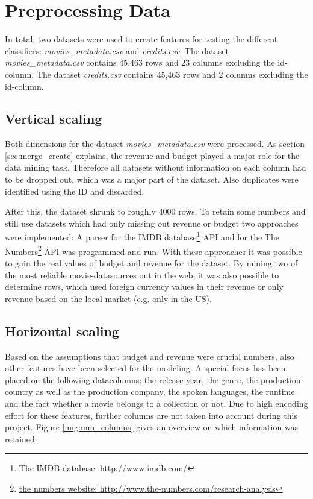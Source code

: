 \section{Preprocessing Data}
\label{cha:preprocessing}

In total, two datasets were used to create features for testing the different classifiers:
\textit{movies\_metadata.csv} and \textit{credits.csv}. The dataset \textit{movies\_metadata.csv} contains 45,463 rows and 23 columns excluding the id-column. The dataset \textit{credits.csv} contains 45,463 rows and 2 columns excluding the id-column.

\subsection{Vertical scaling}
Both dimensions for the dataset \textit{movies\_metadata.csv} were processed. As section \ref{sec:merge_create} explains, the revenue and budget played a major role for the data mining task. Therefore all datasets without information on each column had to be dropped out, which was a major part of the dataset. Also duplicates were identified using the ID and discarded. 
 
After this, the dataset shrunk to roughly 4000 rows. To retain some numbers and still use datasets which had only missing out revenue or budget two approaches were implemented: A parser for the IMDB database\footnote{
\hyperref{http://www.imdb.com/}{external_sources}{ref:IMDB}{The IMDB database: http://www.imdb.com/}} API and for the The Numbers\footnote{\hyperref{http://www.the-numbers.com/research-analysis}{external_sources}{ref:numbers}{the numbers website: http://www.the-numbers.com/research-analysis}} API was programmed and run. With these approaches it was possible to gain the real values of budget and revenue for the dataset. By mining two of the most reliable movie-datasources out in the web, it was also possible to determine rows, which used foreign currency values in their revenue or only revenue based on the local market (e.g. only in the US).

\subsection{Horizontal scaling}
Based on the assumptions that budget and revenue were crucial numbers, also other features have been selected for the modeling. A special focus has been placed on the following datacolumns: the release year, the genre, the production country as well as the production company, the spoken languages, the runtime and the fact whether a movie belongs to a collection or not. Due to high encoding effort for these features, further columns are not taken into account during this project. Figure \ref{img:mm_columns} gives an overview on which information was retained.

